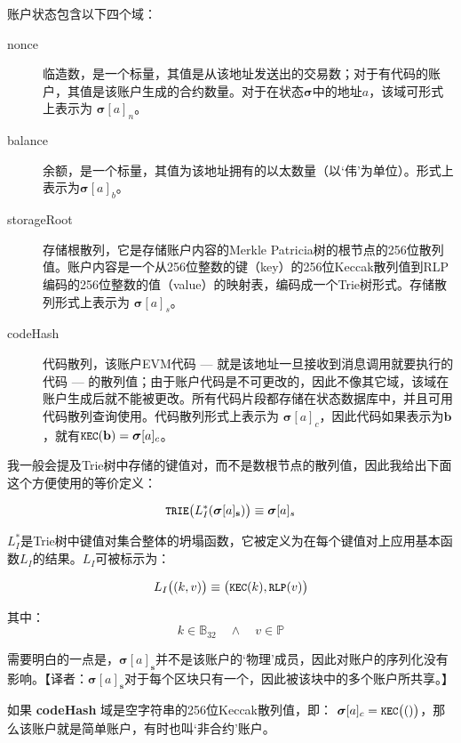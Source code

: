 \documentclass[UTF8,nofonts]{ctexart}
\begin{document}
\begin{multicols}{2}
账户状态包含以下四个域：

\begin{description}
\item[nonce] 临造数，是一个标量，其值是从该地址发送出的交易数；对于有代码的账户，其值是该账户生成的合约数量。对于在状态$\boldsymbol{\sigma}$中的地址$a$，该域可形式上表示为 $\boldsymbol{\sigma}[a]_n$。
\item[balance] 余额，是一个标量，其值为该地址拥有的以太数量（以`伟'为单位）。形式上表示为$\boldsymbol{\sigma}[a]_b$。
\item[storageRoot] 存储根散列，它是存储账户内容的Merkle Patricia树的根节点的256位散列值。账户内容是一个从256位整数的键（key）的256位Keccak散列值到RLP编码的256位整数的值（value）的映射表，编码成一个Trie树形式。存储散列形式上表示为 $\boldsymbol{\sigma}[a]_s$。
\item[codeHash] 代码散列，该账户EVM代码 --- 就是该地址一旦接收到消息调用就要执行的代码 --- 的散列值；由于账户代码是不可更改的，因此不像其它域，该域在账户生成后就不能被更改。所有代码片段都存储在状态数据库中，并且可用代码散列查询使用。代码散列形式上表示为 $\boldsymbol{\sigma}[a]_c$，因此代码如果表示为$\mathbf{b}$，就有$\texttt{\small KEC}(\mathbf{b}) = \boldsymbol{\sigma}[a]_c$。
\end{description}

我一般会提及Trie树中存储的键值对，而不是数根节点的散列值，因此我给出下面这个方便使用的等价定义：

\begin{equation}
\texttt{\small TRIE}\big(L_I^*(\boldsymbol{\sigma}[a]_\mathbf{s})\big) \equiv \boldsymbol{\sigma}[a]_s
\end{equation}

$L_I^*$是Trie树中键值对集合整体的坍塌函数，它被定义为在每个键值对上应用基本函数$L_I$的结果。$L_I$可被标示为：

\begin{equation}
L_I\big( (k, v) \big) \equiv \big(\texttt{\small KEC}(k), \texttt{\small RLP}(v)\big)
\end{equation}

其中：
\begin{equation}
k \in \mathbb{B}_{32} \quad \wedge \quad v \in \mathbb{P}
\end{equation}

需要明白的一点是，$\boldsymbol{\sigma}[a]_\mathbf{s}$并不是该账户的`物理'成员，因此对账户的序列化没有影响。【译者：$\boldsymbol{\sigma}[a]_\mathbf{s}$对于每个区块只有一个，因此被该块中的多个账户所共享。】

如果 \textbf{codeHash} 域是空字符串的256位Keccak散列值，即： $\boldsymbol{\sigma}[a]_c = \texttt{\small KEC}\big(()\big)$，那么该账户就是简单账户，有时也叫`非合约'账户。


\end{multicols}
\end{document}
